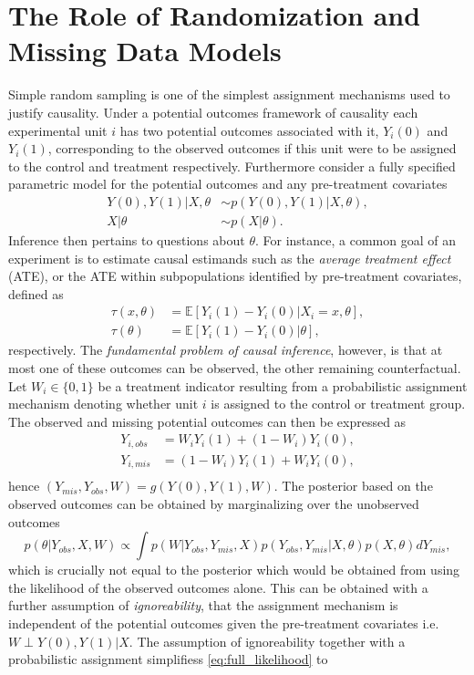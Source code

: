 \documentclass[11pt]{article}
\begin{document}
\section{The Role of Randomization and Missing Data Models}
\label{sec:causal_models}
Simple random sampling is one of the simplest assignment mechanisms used to justify causality. Under a potential outcomes framework of causality each experimental unit $i$ has two potential outcomes associated with it, $Y_i(0)$ and $Y_i(1)$, corresponding to the observed outcomes if this unit were to be assigned to the control and treatment respectively. Furthermore consider a fully specified parametric model for the potential outcomes and any pre-treatment covariates
\begin{align*}
  Y(0),Y(1)|X,\theta &\sim p (Y(0),Y(1)|X,\theta),\\
    X|\theta &\sim p (X|\theta).
\end{align*}
Inference then pertains to questions about $\theta$. For instance, a common goal of an experiment is to estimate causal estimands such as the \textit{average treatment effect} (ATE), or the ATE within subpopulations identified by pre-treatment covariates, defined as
\begin{align*}
  \tau(x,\theta) &= \mathbb{E}[Y_i(1)-Y_i(0)|X_i=x, \theta],\\
  \tau(\theta) &= \mathbb{E}[Y_i(1)-Y_i(0)|\theta],
\end{align*}
respectively. 
The \textit{fundamental problem of causal inference}, however, is that at most one of these outcomes can be observed, the other remaining counterfactual.
Let $W_i\in \lbrace 0,1 \rbrace$ be a treatment indicator resulting from a probabilistic assignment mechanism denoting whether unit $i$ is assigned to the control or treatment group. The observed and missing potential outcomes can then be expressed as
\begin{align*}
  Y_{i,obs} &= W_iY_i(1)+(1-W_i)Y_i(0),\\
  Y_{i,mis} &= (1-W_i)Y_i(1)+W_iY_i(0),\\
\end{align*}
hence $(Y_{mis}, Y_{obs},W) = g(Y(0),Y(1), W)$.
The posterior based on the observed outcomes can be obtained by marginalizing over the unobserved outcomes
\begin{equation}
  \label{eq:full_likelihood}
  p(\theta|Y_{obs}, X, W) \propto \int p(W|Y_{obs},Y_{mis},X) p(Y_{obs},Y_{mis}|X, \theta) p(X,\theta) dY_{mis},
\end{equation}
which is crucially not equal to the posterior which would be obtained from using the likelihood of the observed outcomes alone. This can be obtained with a further assumption of \textit{ignoreability}, that the assignment mechanism is independent of the potential outcomes given the pre-treatment covariates i.e. $W \perp Y(0), Y(1) | X$. The assumption of ignoreability together with a probabilistic assignment simplifiess \eqref{eq:full_likelihood} to
\end{document}
